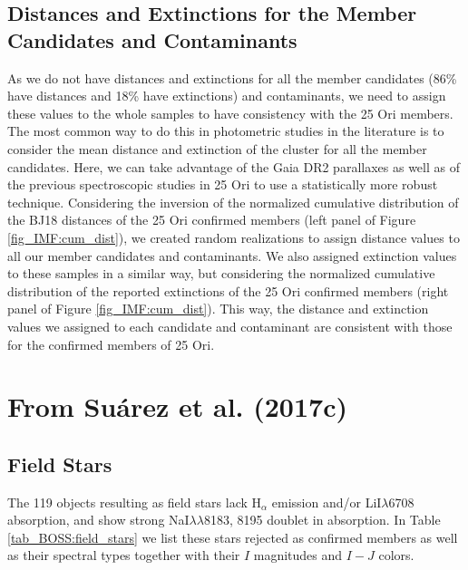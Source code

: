 \documentclass[12pt]{article}
\begin{document}
\subsection[Distance and Extinction Assignments]{Distances and Extinctions for the Member Candidates and Contaminants}
\label{sec_app_IMF:distance_extinction}
As we do not have distances and extinctions for all the member candidates (86\% have distances and 18\% have extinctions) and contaminants, we need to assign these values to the whole samples to have consistency with the 25 Ori members. The most common way to do this in photometric studies in the literature is to consider the mean distance and extinction of the cluster for all the member candidates. Here, we can take advantage of the Gaia DR2 parallaxes as well as of the previous spectroscopic studies in 25 Ori to use a statistically more robust technique. Considering the inversion of the normalized cumulative distribution of the BJ18 distances of the 25 Ori confirmed members (left panel of Figure \ref{fig_IMF:cum_dist}), we created random realizations to assign distance values to all our member candidates and contaminants. We also assigned extinction values to these samples in a similar way, but considering the normalized cumulative distribution of the reported extinctions of the 25 Ori confirmed members (right panel of Figure \ref{fig_IMF:cum_dist}). This way, the distance and extinction values we assigned to each candidate and contaminant are consistent with those for the confirmed members of 25 Ori.

\section[From Su\'arez et al. (2017\lowercase{c})]{From Su\'arez et al. (2017\lowercase{c})}
\subsection{Field Stars}
\label{appendix_BOSS}

The 119 objects resulting as field stars lack H$_\alpha$ emission and/or LiI$\lambda$6708 absorption, and show strong NaI$\lambda\lambda$8183, 8195 doublet in absorption. In Table \ref{tab_BOSS:field_stars} we list these stars rejected as confirmed members as well as their spectral types together with their $I$ magnitudes and $I-J$ colors.
\end{document}
